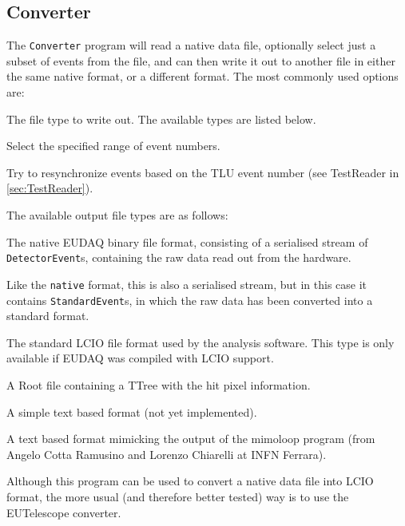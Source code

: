 \subsection{Converter}
\label{sec:Converter}
The \texttt{Converter} program will read a native data file,
optionally select just a subset of events from the file,
and can then write it out to another file in either the same native format, or a different format.
The most commonly used options are:
\begin{description}
The file type to write out.
The available types are listed below.

Select the specified range of event numbers.

Try to resynchronize events based on the TLU event number
(see TestReader in \autoref{sec:TestReader}).

\end{description}

The available output file types are as follows:

\begin{description}\label{lst:FileTypes}

The native EUDAQ binary file format, consisting of a serialised stream of
\texttt{DetectorEvent}s, containing the raw data read out from the hardware.

Like the \texttt{native} format, this is also a serialised stream,
but in this case it contains \texttt{StandardEvent}s,
in which the raw data has been converted into a standard format.

The standard \gls{LCIO} file format used by the analysis software.
This type is only available if EUDAQ was compiled with \gls{LCIO} support.

A Root file containing a TTree with the hit pixel information.

A simple text based format (not yet implemented).

A text based format mimicking the output of the mimoloop program
(from Angelo Cotta Ramusino and Lorenzo Chiarelli at INFN Ferrara).

\end{description}

Although this program can be used to convert a native data file into \gls{LCIO} format,
the more usual (and therefore better tested) way is to use the EUTelescope converter.

